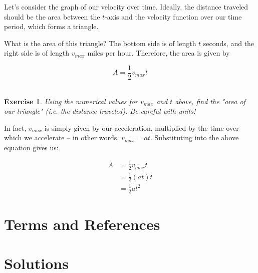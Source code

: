 \documentclass{book}
\newtheorem{exercise}{\\ \bf Exercise}
\begin{document}
Let's consider the graph of our velocity over time. Ideally, the distance traveled should be the area between the $t$-axis and the velocity function over our time period, which forms a triangle. 


What is the area of this triangle? The bottom side is of length $t$ seconds, and the right side is of length $v_{max}$ miles per hour. Therefore, the area is given by 

\begin{equation}
A = \frac{1}{2} v_{max} t
\end{equation}


\begin{exercise}
\label{const-velocity-numerical}
Using the numerical values for $v_{max}$ and $t$ above, find the "area of our triangle" (i.e. the distance traveled). Be careful with units!
\end{exercise}

In fact, $v_{max}$ is simply given by our acceleration, multiplied by the time over which we accelerate -- in other words, $v_{max} = at$. Substituting into the above equation gives us:

\begin{align*}
A &= \frac{1}{2} v_{max} t \\
&= \frac{1}{2} (a t) t \\
&= \frac{1}{2} a t^2
\end{align*}















\newpage
\section{Terms and References}

\section{Solutions}
\end{document}
